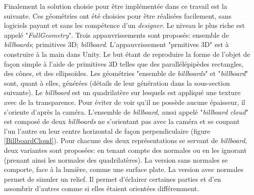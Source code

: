 		Finalement la solution choisie pour être implémentée dans ce travail est la suivante. Ces géométries ont été choisies pour être réalisées facilement, sans logiciels payant et sans les compétence d'un \textit{designer}. Le niveau le plus riche est appelé "\textit{FullGeometry}". Trois appauvrissements sont proposés: ensemble de \textit{billboards}; primitives 3D; \textit{billboard}. L'appauvrissement "prmitives 3D" est à construire à la main dans Unity. Le but étant de reproduire la forme de l'objet de façon simple à l'aide de primitives 3D telles que des parallélépipèdes rectangles, des cônes, et des ellipsoïdes. Les géométries "ensemble de \textit{billboards}" et "\textit{billboard}" sont, quant à elles, générées (détails de leur génération dans la sous-section suivante).	Le \textit{billboard} est un quadrilatère sur lesquels est appliqué une texture avec de la transparence. Pour éviter de voir qu'il ne possède aucune épaisseur, il s'oriente d'après la caméra. L'ensemble de \textit{billboard}, aussi appelé "\textit{billboard cloud}" est composé de deux \textit{billboards} ne s'orientant pas avec la caméra et se coupant l'un l'autre en leur centre horizontal de façon perpendiculaire (figure \ref{BillboardCloud}). Pour chacune des deux représentations se servant de \textit{billboard}, deux variantes sont proposées: en tenant compte des normales ou en les ignorant (prenant ainsi les normales des quadrilatères). La version sans normales se comporte, face à la lumière, comme une surface plate. La version avec normales permet de simuler un relief. Il permet d'éclairer certaines parties et d'en assombrir d'autres comme si elles étaient orientées différemment.\medskip
		
		\begin{minipage}{\linewidth}
			\label{BillboardCloud}
		\end{minipage}\medskip
	
